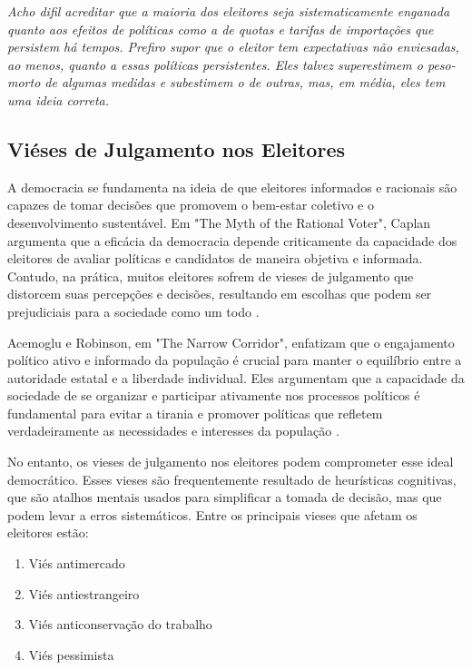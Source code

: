 \begin{citacao}
    \textit{Acho difil acreditar que a maioria dos eleitores seja sistematicamente enganada quanto aos efeitos de políticas como a de quotas e tarifas de importações que persistem há tempos. Prefiro supor que o eleitor tem expectativas não enviesadas, ao menos, quanto a essas políticas persistentes. Eles talvez superestimem o peso-morto de algumas medidas e subestimem o de outras, mas, em média, eles tem uma ideia correta.
    }  \cite{becker1976}
\end{citacao}

\subsection{Viéses de Julgamento nos Eleitores}

A democracia se fundamenta na ideia de que eleitores informados e racionais são capazes de tomar decisões que promovem o bem-estar coletivo e o desenvolvimento sustentável. Em "The Myth of the Rational Voter", Caplan argumenta que a eficácia da democracia depende criticamente da capacidade dos eleitores de avaliar políticas e candidatos de maneira objetiva e informada. Contudo, na prática, muitos eleitores sofrem de vieses de julgamento que distorcem suas percepções e decisões, resultando em escolhas que podem ser prejudiciais para a sociedade como um todo \cite{The_Myth_of_the_Rational_Voter}.

Acemoglu e Robinson, em "The Narrow Corridor", enfatizam que o engajamento político ativo e informado da população é crucial para manter o equilíbrio entre a autoridade estatal e a liberdade individual. Eles argumentam que a capacidade da sociedade de se organizar e participar ativamente nos processos políticos é fundamental para evitar a tirania e promover políticas que refletem verdadeiramente as necessidades e interesses da população \cite{acemoglu2019narrow}.

No entanto, os vieses de julgamento nos eleitores podem comprometer esse ideal democrático. Esses vieses são frequentemente resultado de heurísticas cognitivas, que são atalhos mentais usados para simplificar a tomada de decisão, mas que podem levar a erros sistemáticos. Entre os principais vieses que afetam os eleitores estão:

\begin{enumerate}
    \item Viés antimercado
    \item Viés antiestrangeiro
    \item Viés anticonservação do trabalho
    \item Viés pessimista
\end{enumerate}

